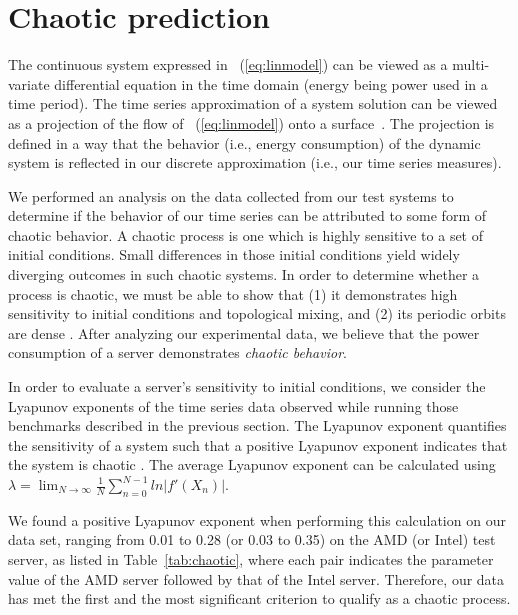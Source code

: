 \section{Chaotic prediction}
\label{sec:chaospredict}
The continuous system expressed in \equationname~(\ref{eq:linmodel}) can
be viewed as a multi-variate differential equation in the time domain
(energy being power used in a time period).  The time series
approximation of a system solution can be viewed as a projection of
the flow of \equationname~(\ref{eq:linmodel}) onto a surface~\cite{Liu2010}.
The projection is defined in a way that the behavior (i.e., energy consumption)
of the dynamic system is reflected in our discrete approximation
(i.e., our time series measures).

We performed an analysis on the data collected from our test systems to
determine if the behavior of our time series can be attributed to some
form of chaotic behavior.  A chaotic process is one which is highly
sensitive to a set of initial conditions.  Small differences in those
initial conditions yield widely diverging outcomes in such chaotic
systems.  In order to determine whether a process is chaotic, we must be
able to show that (1) it demonstrates high sensitivity to initial
conditions and topological mixing, and (2) its periodic orbits are dense
\cite{Sprott2003}.  After analyzing our experimental data, we believe
that the power consumption of a server demonstrates \textit{chaotic behavior}.

In order to evaluate a server's sensitivity to initial conditions, we
consider the Lyapunov exponents of the time series data observed while
running those benchmarks described in the previous section.  The
Lyapunov exponent quantifies the sensitivity of a system such that a
positive Lyapunov exponent indicates that the system is chaotic
\cite{Sprott2003}.  The average Lyapunov exponent can be calculated using
$\lambda = \displaystyle\lim_{N\to\infty}\frac{1}{N}\sum_{n=0}^{N-1}ln|f'(X_n)|$.

We found a positive Lyapunov exponent when performing this calculation
on our data set, ranging from 0.01 to 0.28 (or 0.03 to 0.35) on the AMD
(or Intel) test server, as listed in Table~\ref{tab:chaotic}, where
each pair indicates the parameter value of the AMD server followed by
that of the Intel server.  Therefore, our data has met the first and
the most significant criterion to qualify as a chaotic process.

